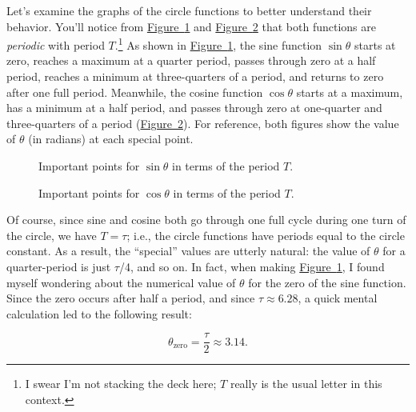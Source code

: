 \documentclass{article}
\begin{document}
Let's examine the graphs of the circle functions to better understand their behavior. You'll notice from \hyperref[fig:sine-with-tau]{Figure~}\ref{fig:sine-with-tau} and \hyperref[fig:cosine-with-tau]{Figure~}\ref{fig:cosine-with-tau} that both functions are \emph{periodic} with period $T$.\footnote{I swear I'm not stacking the deck here; $T$ really is the usual letter in this context.} As shown in \hyperref[fig:sine-with-tau]{Figure~}\ref{fig:sine-with-tau}, the sine function $\sin\theta$ starts at zero, reaches a maximum at a quarter period, passes through zero at a half period, reaches a minimum at three-quarters of a period, and returns to zero after one full period. Meanwhile, the cosine function $\cos\theta$ starts at a maximum, has a minimum at a half period, and passes through zero at one-quarter and three-quarters of a period  (\hyperref[fig:cosine-with-tau]{Figure~}\ref{fig:cosine-with-tau}). For reference, both figures show the value of $\theta$ (in radians) at each special point.

\begin{figure}
\begin{center}
\end{center}
\caption{Important points for $\sin\theta$ in terms of the period $T$.\label{fig:sine-with-tau}}
\end{figure}

\begin{figure}
\begin{center}
\end{center}
\caption{Important points for $\cos\theta$ in terms of the period $T$.\label{fig:cosine-with-tau}}
\end{figure}

Of course, since sine and cosine both go through one full cycle during one turn of the circle, we have $T = \tau$; i.e., the circle functions have periods equal to the circle constant. As a result, the ``special'' values are utterly natural: the value of $\theta$ for a quarter-period is just $\tau$/4, and so on. In fact, when making \hyperref[fig:sine-with-tau]{Figure~}\ref{fig:sine-with-tau}, I found myself wondering about the numerical value of $\theta$ for the zero of the sine function. Since the zero occurs after half a period, and since $\tau \approx 6.28$, a quick mental calculation led to the following result:

\[
  \theta_\mathrm{zero} = \frac{\tau}{2} \approx 3.14.
\]
\end{document}
